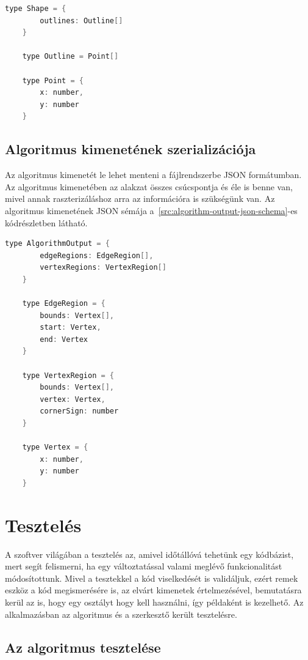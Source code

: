 \begin{lstlisting}[language=C]
	type Shape = {
		outlines: Outline[]
	}

	type Outline = Point[]

	type Point = {
		x: number,
		y: number
	}
\end{lstlisting}


\subsection{Algoritmus kimenetének szerializációja}
Az algoritmus kimenetét le lehet menteni a fájlrendszerbe JSON formátumban. Az algoritmus kimenetében az alakzat összes csúcspontja és éle is benne van, mivel annak raszterizáláshoz arra az információra is szükségünk van. Az algoritmus kimenetének JSON sémája a~\ref{src:algorithm-output-json-schema}-es kódrészletben látható.

\begin{lstlisting}[language=C]
	type AlgorithmOutput = {
		edgeRegions: EdgeRegion[],
		vertexRegions: VertexRegion[]
	}

	type EdgeRegion = {
		bounds: Vertex[],
		start: Vertex,
		end: Vertex
	}

	type VertexRegion = {
		bounds: Vertex[],
		vertex: Vertex,
		cornerSign: number
	}

	type Vertex = {
		x: number,
		y: number
	}
\end{lstlisting}


\section{Tesztelés}

A szoftver világában a tesztelés az, amivel időtállóvá tehetünk egy kódbázist, mert segít felismerni, ha egy változtatással valami meglévő funkcionalitást módosítottunk. Mivel a tesztekkel a kód viselkedését is validáljuk, ezért remek eszköz a kód megismerésére is, az elvárt kimenetek értelmezésével, bemutatásra kerül az is, hogy egy osztályt hogy kell használni, így példaként is kezelhető.
Az alkalmazásban az algoritmus és a szerkesztő került tesztelésre.

\subsection{Az algoritmus tesztelése}

